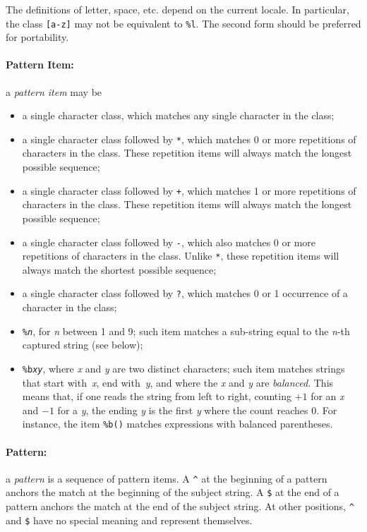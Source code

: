 \documentclass[11pt]{article}
\newcommand{\M}[1]{{\rm\emph{#1}}}
\newcommand{\T}[1]{{\tt #1}}
\newcommand{\Math}[1]{$#1$}
\newcommand{\Def}[1]{\emph{#1}\index{#1}}
\begin{document}
The definitions of letter, space, etc. depend on the current locale.
In particular, the class \verb|[a-z]| may not be equivalent to \verb|%l|.
The second form should be preferred for portability.

\paragraph{Pattern Item:}
a \Def{pattern item} may be
\begin{itemize}
\item
a single character class,
which matches any single character in the class;
\item
a single character class followed by \verb|*|,
which matches 0 or more repetitions of characters in the class.
These repetition items will always match the longest possible sequence;
\item
a single character class followed by \verb|+|,
which matches 1 or more repetitions of characters in the class.
These repetition items will always match the longest possible sequence;
\item
a single character class followed by \verb|-|,
which also matches 0 or more repetitions of characters in the class.
Unlike \verb|*|,
these repetition items will always match the shortest possible sequence;
\item
a single character class followed by \verb|?|,
which matches 0 or 1 occurrence of a character in the class;
\item
\T{\%\M{n}}, for \M{n} between 1 and 9;
such item matches a sub-string equal to the \M{n}-th captured string
(see below);
\item
\T{\%b\M{xy}}, where \M{x} and \M{y} are two distinct characters;
such item matches strings that start with~\M{x}, end with~\M{y},
and where the \M{x} and \M{y} are \emph{balanced}.
This means that, if one reads the string from left to right,
counting \Math{+1} for an \M{x} and \Math{-1} for a \M{y},
the ending \M{y} is the first \M{y} where the count reaches 0.
For instance, the item \verb|%b()| matches expressions with
balanced parentheses.
\end{itemize}

\paragraph{Pattern:}
a \Def{pattern} is a sequence of pattern items.
A \verb|^| at the beginning of a pattern anchors the match at the
beginning of the subject string.
A \verb|$| at the end of a pattern anchors the match at the
end of the subject string.
At other positions,
\verb|^| and \verb|$| have no special meaning and represent themselves.
\end{document}
